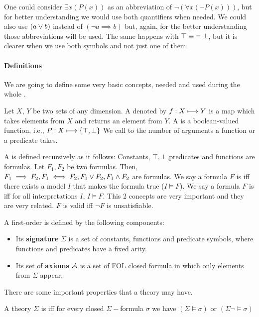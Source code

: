 One could consider $\exists x(P(x))$  as an abbreviation of $\neg (\forall x(\neg P(x)))$, but for better understanding we would use both quantifiers when needed.
We could also use $(a \vee b)$ instead of $(\neg a \implies b)$ but, again, for the better understanding those abbreviations will be used.
The same happens with $\top \equiv \neg \perp$, but it is clearer when we use both symbols and not just one of them.


\paragraph{Definitions}

We are going to define some very basic concepts, needed and used during the whole \thisworkmp.


Let $X$, $Y$ be two sets of any dimension.
%
A  denoted by $f : X\longmapsto Y$ is a map which takes elements from $X$ and returns an element from $Y$.
%
A  is a boolean-valued function, i.e., $P : X\longmapsto \{\top,\perp\}$
%
We call  to the number of arguments a function or a predicate takes.

A  is defined recursively as it follows: Constants, $\top,\perp$,predicates and functions are formulas. Let $F_1,F_2$ be two formulas. Then, $F_1\implies F_2, F_1\iff F_2, F_1\vee F_2, F_1\wedge F_2$ are formulas.
%
We say a formula $F$ is  iff there exists a model $I$ that makes the formula true ($I \vDash F$). 
%
We say a formula $F$ is  iff for all interpretations $I$, $I\vDash F$.
\label{def:validity}
This 2 concepts are very important and they are very related. $F$ is valid iff $\neg F$ is unsatisfiable. 


A first-order  is defined by the following components: 
\begin{itemize}
	\item Its \textbf{signature} $\Sigma$ is a set of constants, functions and predicate symbols, where functions and predicates have a fixed arity.
	\item Its set of \textbf{axioms} $\mathcal{A}$ is a set of \gls{FOL} closed formula in which only elements from $\Sigma$ appear.
\end{itemize}


There are some important properties that a theory may have. 

A theory $\Sigma$ is  iff for every closed $\Sigma-$formula $\sigma$ we have $(\Sigma\vDash \sigma) \text{ or } (\Sigma\neg\vDash \sigma) $

